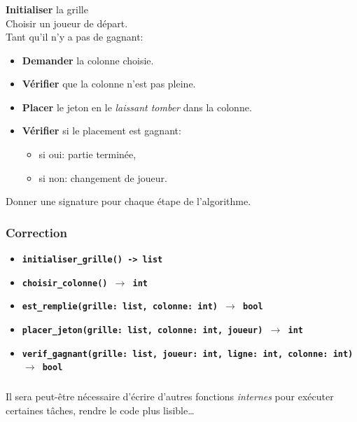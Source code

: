 \documentclass[svgnames,11pt]{beamer}
\begin{document}
\begin{frame}
    \frametitle{}
    \textbf{Initialiser} la grille\\
    Choisir un joueur de départ.\\
    Tant qu'il n'y a pas de gagnant:
    \begin{itemize}
        \item \textbf{Demander} la colonne choisie.
        \item \textbf{Vérifier} que la colonne n'est pas pleine.
        \item \textbf{Placer} le jeton en le \emph{laissant tomber} dans la colonne.
        \item \textbf{Vérifier} si le placement est gagnant:
              \begin{itemize}
                  \item si oui: partie terminée,
                  \item si non: changement de joueur.
              \end{itemize}
    \end{itemize}
    \begin{activite}
        Donner une signature pour chaque étape de l'algorithme.
    \end{activite}

\end{frame}
\begin{frame}
    \frametitle{Correction}

    \begin{itemize}
        \item<1-> \textbf{\texttt{initialiser\_grille() -> list}}
        \item<2-> \textbf{\texttt{choisir\_colonne() $\rightarrow$ int}}
        \item<3-> \textbf{\texttt{est\_remplie(grille: list, colonne: int) $\rightarrow$ bool}}
        \item<4-> \textbf{\texttt{placer\_jeton(grille: list, colonne: int, joueur) $\rightarrow$ int}}
        \item<5-> \textbf{\texttt{verif\_gagnant(grille: list, joueur: int, ligne: int, colonne: int) $\rightarrow$ bool}}
    \end{itemize}

\end{frame}
\begin{frame}
    \frametitle{}

    \begin{aretenir}[Remarque]
    Il sera peut-être nécessaire d'écrire d'autres fonctions  \emph{internes} pour exécuter certaines tâches, rendre le code plus lisible\dots
    \end{aretenir}

\end{frame}
\end{document}
